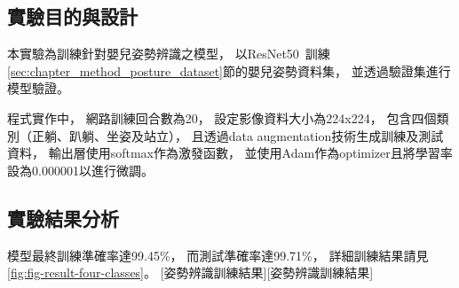 \documentclass[class=NCU_thesis, crop=false]{standalone}
\begin{document}
\subsection{實驗目的與設計}
本實驗為訓練針對嬰兒姿勢辨識之模型，
以ResNet50~\cite{he_deep_2016}訓練\ref{sec:chapter_method_posture_dataset}節的嬰兒姿勢資料集，
並透過驗證集進行模型驗證。

程式實作中，
網路訓練回合數為20，
設定影像資料大小為224x224，
包含四個類別（正躺、趴躺、坐姿及站立），
且透過data augmentation技術生成訓練及測試資料，
輸出層使用softmax作為激發函數，
並使用Adam作為optimizer且將學習率設為0.000001以進行微調。

\subsection{實驗結果分析}
模型最終訓練準確率達99.45\%，
而測試準確率達99.71\%，
詳細訓練結果請見\cref{fig:fig-result-four-classes}。
[姿勢辨識訓練結果][姿勢辨識訓練結果]
\end{document}
